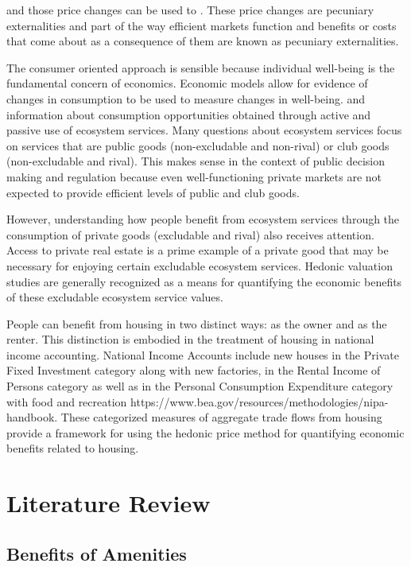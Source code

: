 \documentclass[ecta,nameyear,draft]{econsocart}
\theoremstyle{plain}
\theoremstyle{remark}
\begin{document}
and those price changes can be used to . These price changes are pecuniary externalities and part of the way efficient markets function and benefits or costs that come about as a consequence of them are known as pecuniary externalities. 



The consumer oriented approach is sensible because individual well-being is the fundamental concern of economics. Economic models allow for evidence of changes in consumption to be used to measure changes in well-being. and information about consumption opportunities obtained through  active and passive use of ecosystem services. Many questions about ecosystem services focus on services that are public goods (non-excludable and non-rival) or club goods (non-excludable and rival). This makes sense in the context of public decision making and regulation because even well-functioning private markets are not expected to provide efficient levels of public and club goods.  

However, understanding how people benefit from ecosystem services through the consumption of private goods (excludable and rival)  also receives attention. Access to private real estate is a prime example of a private good that may be necessary for enjoying certain excludable ecosystem services. Hedonic valuation studies are generally recognized as a means for quantifying the economic benefits of these excludable ecosystem service values. 

People can benefit from housing in two distinct ways: as the owner and as the renter. This distinction is embodied in the treatment of housing in national income accounting.  National Income Accounts include new houses in the Private Fixed Investment category along with new factories, in the Rental Income of Persons category as well as in the Personal Consumption Expenditure category with food and recreation https://www.bea.gov/resources/methodologies/nipa-handbook. These categorized measures of aggregate trade flows from housing provide a framework for using the hedonic price method for quantifying economic benefits related to housing. 

\section{Literature Review}

\subsection{Benefits of Amenities}
\end{document}
